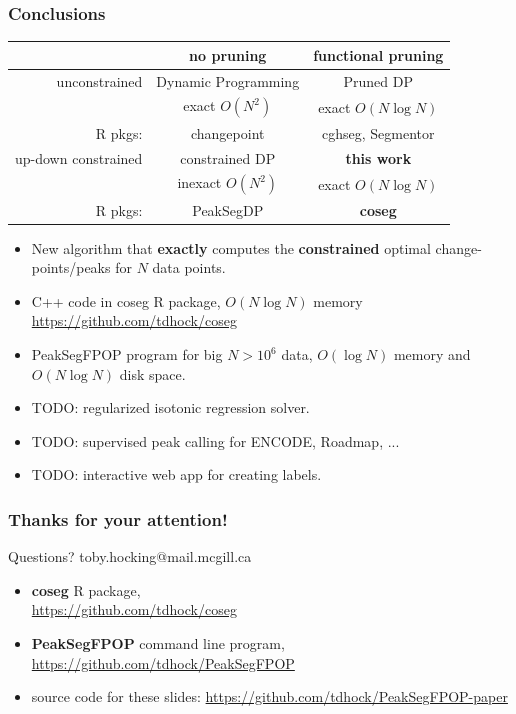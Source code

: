 \documentclass{beamer}
\begin{document}
\begin{frame}
  \frametitle{Conclusions}
  \begin{tabular}{r|c|c}
    & no pruning & functional pruning \\
    \hline
    unconstrained & Dynamic Programming & Pruned DP \\
     & exact $O(N^2)$ & exact $O(N\log N)$\\
    R pkgs: & changepoint & cghseg, Segmentor\\
    \hline
    up-down constrained & constrained DP & \textbf{this work} \\
     & inexact $O(N^2)$ & exact $O(N\log N)$\\
    R pkgs: & PeakSegDP & \textbf{coseg}\\
    \hline
  \end{tabular}
  \begin{itemize}
  \item New algorithm that \textbf{exactly} computes the
    \textbf{constrained} optimal change-points/peaks for $N$ data points.
  \item C++ code in coseg R package, $O(N \log N)$ memory
    \url{https://github.com/tdhock/coseg}
  \item PeakSegFPOP program for big $N > 10^6$ data,
    $O(\log N)$ memory and $O(N\log N)$ disk space.
  \item TODO: regularized isotonic regression solver.
  \item TODO: supervised peak calling for ENCODE, Roadmap, ...
  \item TODO: interactive web app for creating labels.
  \end{itemize}
\end{frame}

\begin{frame}
  \frametitle{Thanks for your attention!}

  Questions? toby.hocking@mail.mcgill.ca
  \begin{itemize}
  \item 
  \textbf{coseg} R package, \\
  \url{https://github.com/tdhock/coseg}
  \item 
    \textbf{PeakSegFPOP} command line program, 
  \url{https://github.com/tdhock/PeakSegFPOP}
  \item source code for these slides:
  \url{https://github.com/tdhock/PeakSegFPOP-paper}
  \end{itemize}
\end{frame}
\end{document}

